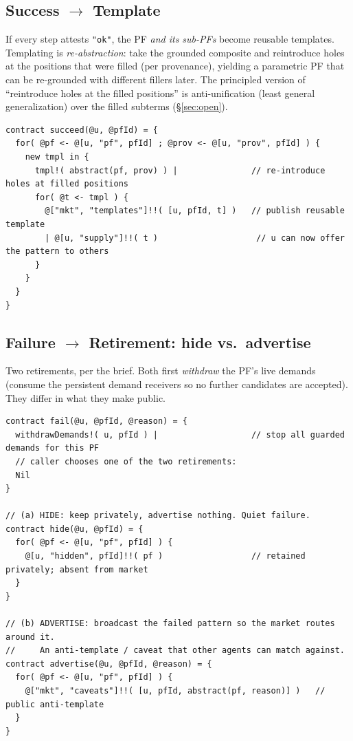 \documentclass[11pt]{article}
\newcommand{\code}[1]{\lstinline[language=rho,basicstyle=\ttfamily\small]|#1|}
\begin{document}
\subsection{Success $\to$ Template}\label{sec:template}
If every step attests \code{"ok"}, the PF \emph{and its sub-PFs} become reusable templates. Templating
is \emph{re-abstraction}: take the grounded composite and reintroduce holes at the positions that were
filled (per provenance), yielding a parametric PF that can be re-grounded with different fillers later.
The principled version of ``reintroduce holes at the filled positions'' is anti-unification (least
general generalization) over the filled subterms (\S\ref{sec:open}).
\begin{lstlisting}[language=rho]
contract succeed(@u, @pfId) = {
  for( @pf <- @[u, "pf", pfId] ; @prov <- @[u, "prov", pfId] ) {
    new tmpl in {
      tmpl!( abstract(pf, prov) ) |               // re-introduce holes at filled positions
      for( @t <- tmpl ) {
        @["mkt", "templates"]!!( [u, pfId, t] )   // publish reusable template
        | @[u, "supply"]!!( t )                    // u can now offer the pattern to others
      }
    }
  }
}
\end{lstlisting}

\subsection{Failure $\to$ Retirement: hide vs.\ advertise}\label{sec:retire}
Two retirements, per the brief. Both first \emph{withdraw} the PF's live demands (consume the
persistent demand receivers so no further candidates are accepted). They differ in what they make
public.
\begin{lstlisting}[language=rho]
contract fail(@u, @pfId, @reason) = {
  withdrawDemands!( u, pfId ) |                   // stop all guarded demands for this PF
  // caller chooses one of the two retirements:
  Nil
}

// (a) HIDE: keep privately, advertise nothing. Quiet failure.
contract hide(@u, @pfId) = {
  for( @pf <- @[u, "pf", pfId] ) {
    @[u, "hidden", pfId]!!( pf )                  // retained privately; absent from market
  }
}

// (b) ADVERTISE: broadcast the failed pattern so the market routes around it.
//     An anti-template / caveat that other agents can match against.
contract advertise(@u, @pfId, @reason) = {
  for( @pf <- @[u, "pf", pfId] ) {
    @["mkt", "caveats"]!!( [u, pfId, abstract(pf, reason)] )   // public anti-template
  }
}
\end{lstlisting}
\end{document}
